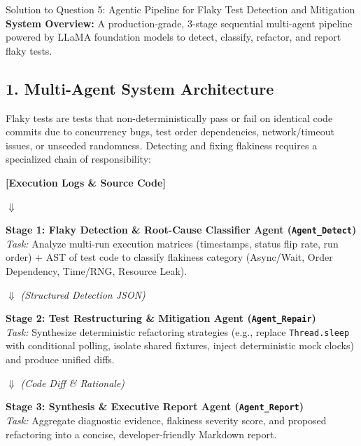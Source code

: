 \documentclass[11pt,a4paper]{article}
\begin{document}
\begin{solutionbox}{Solution to Question 5: Agentic Pipeline for Flaky Test Detection and Mitigation}
\textbf{System Overview:} A production-grade, 3-stage sequential multi-agent pipeline powered by LLaMA foundation models to detect, classify, refactor, and report flaky tests.

\subsection*{1. Multi-Agent System Architecture}
Flaky tests are tests that non-deterministically pass or fail on identical code commits due to concurrency bugs, test order dependencies, network/timeout issues, or unseeded randomness. Detecting and fixing flakiness requires a specialized chain of responsibility:

\begin{tcolorbox}[colback=white,colframe=primary,arc=2mm,title=\textbf{Flaky Test Multi-Agent Architecture Pipeline}]
\small
\begin{center}
\textbf{[Execution Logs \& Source Code]}
\end{center}
\vspace{-2mm}
\begin{center}
$\Downarrow$
\end{center}
\vspace{-2mm}
\textbf{Stage 1: Flaky Detection \& Root-Cause Classifier Agent (\texttt{Agent\_Detect})}\\
\textit{Task:} Analyze multi-run execution matrices (timestamps, status flip rate, run order) + AST of test code to classify flakiness category (Async/Wait, Order Dependency, Time/RNG, Resource Leak).
\vspace{-2mm}
\begin{center}
$\Downarrow$ \quad \textit{(Structured Detection JSON)}
\end{center}
\vspace{-2mm}
\textbf{Stage 2: Test Restructuring \& Mitigation Agent (\texttt{Agent\_Repair})}\\
\textit{Task:} Synthesize deterministic refactoring strategies (e.g., replace \texttt{Thread.sleep} with conditional polling, isolate shared fixtures, inject deterministic mock clocks) and produce unified diffs.
\vspace{-2mm}
\begin{center}
$\Downarrow$ \quad \textit{(Code Diff \& Rationale)}
\end{center}
\vspace{-2mm}
\textbf{Stage 3: Synthesis \& Executive Report Agent (\texttt{Agent\_Report})}\\
\textit{Task:} Aggregate diagnostic evidence, flakiness severity score, and proposed refactoring into a concise, developer-friendly Markdown report.
\end{tcolorbox}


\end{solutionbox}
\end{document}
